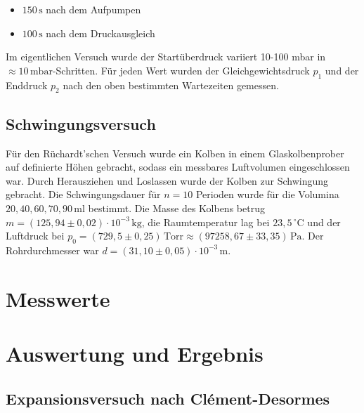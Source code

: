 \documentclass{protokoll}
\begin{document}
\begin{itemize}
    \item $150 \, \mathrm{s}$ nach dem Aufpumpen
    \item $100 \, \mathrm{s}$ nach dem Druckausgleich
\end{itemize}

Im eigentlichen Versuch wurde der Startüberdruck variiert
10-100 mbar in $\approx 10\, \mathrm{mbar}$-Schritten.
Für jeden Wert wurden der Gleichgewichtsdruck $p_1$ und der Enddruck $p_2$ nach 
den oben bestimmten Wartezeiten gemessen.

\subsection{Schwingungsversuch}

Für den Rüchardt’schen Versuch wurde ein Kolben in einem Glaskolbenprober auf 
definierte Höhen gebracht, sodass ein messbares Luftvolumen eingeschlossen war. 
Durch Herausziehen und Loslassen wurde der Kolben zur Schwingung gebracht. Die 
Schwingungsdauer für $n = 10$ Perioden wurde für die Volumina $20, 40, 60, 70, 
90 \, \mathrm{ml}$ bestimmt.  
Die Masse des Kolbens betrug $m = (125{,}94 \pm 0{,}02) \cdot 10^{-3} \, 
\mathrm{kg}$, die Raumtemperatur lag bei $23{,}5\, ^\circ\mathrm{C}$ und der 
Luftdruck bei $p_0 = (729{,}5 \pm 0{,}25)\, \mathrm{Torr} \approx (97258{,}67 
\pm 33{,}35)\, \mathrm{Pa}$. Der Rohrdurchmesser war $d = (31{,}10 \pm 0{,}05) 
\cdot 10^{-3}\, \mathrm{m}$.




\section{Messwerte}

\begin{spalten}

\anderespalte
{}

\end{spalten}





\section{Auswertung und Ergebnis}

\subsection{Expansionsversuch nach Clément-Desormes}
\end{document}
